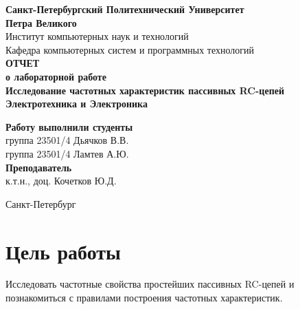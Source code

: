 \documentclass[a4paper,14pt]{extarticle}
\newcommand{\sign}[1][5cm]{\makebox[#1]{\hrulefill}} %
\begin{document}
\begin{titlepage}
\begin{center}
	\textbf{Санкт-Петербургский Политехнический Университет \\Петра Великого}\\[0.3cm]
	\small Институт компьютерных наук и технологий \\[0.3cm]
	\small Кафедра компьютерных систем и программных технологий\\[4cm]
	
	\textbf{ОТЧЕТ}\\ \textbf{о лабораторной работе}\\[0.5cm]
	\textbf{Исследование частотных характеристик пассивных RC-цепей}\\[0.1cm]
	\textbf{Электротехника и Электроника}\\[10.5cm]
\end{center}

\begin{flushright}
	\begin{minipage}{0.60\textwidth}
		\begin{flushleft}
			\small \textbf{Работу выполнили студенты}\\[3mm]
			\small группа 23501/4 \hspace*{17mm} Дьячков В.В.\\[3mm]
			\small группа 23501/4 \hspace*{17mm} Ламтев А.Ю.\\[5mm]
			
			\small \textbf{Преподаватель}\\[5mm]
		 	\small \sign[3.5cm] \hspace*{8mm} к.т.н., доц. Кочетков Ю.Д.\\[0.5cm]
		\end{flushleft}
	\end{minipage}
\end{flushright}

\vfill

\begin{center}
	\small Санкт-Петербург\\
	\small \the\year
\end{center}
\end{titlepage}

\section{Цель работы}

Исследовать частотные свойства простейших пассивных RC­-цепей и познакомиться с правилами построения частотных характеристик.
\end{document}
